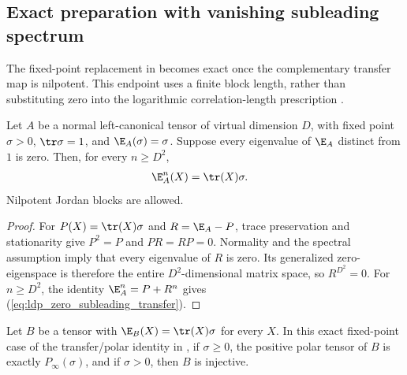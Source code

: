 \subsection{Exact preparation with vanishing subleading spectrum}

The fixed-point replacement in \cite{Malz2024Preparation} becomes exact
once the complementary transfer map is nilpotent. This endpoint uses a
finite block length, rather than substituting zero into the logarithmic
correlation-length prescription
\cite{gap:mswc24_zero_subleading_spectrum_endpoint}.

\begin{lemma}
    \label{thm:ldp_zero_subleading_transfer_stabilization}
    \leanok
    Let $A$ be a normal left-canonical tensor of virtual dimension $D$,
    with fixed point $\sigma>0$, $\tr\sigma=1$, and
    $\E_A(\sigma)=\sigma$. Suppose every eigenvalue of $\E_A$ distinct
    from $1$ is zero. Then, for every $n\geq D^2$,
    \begin{align}
        \E_A^n(X) & =\tr(X)\sigma.
        \label{eq:ldp_zero_subleading_transfer}
    \end{align}
    Nilpotent Jordan blocks are allowed.
\end{lemma}

\begin{proof}\leanok
    For $P(X)=\tr(X)\sigma$ and $R=\E_A-P$, trace preservation and
    stationarity give $P^2=P$ and $PR=RP=0$. Normality and the spectral
    assumption imply that every eigenvalue of $R$ is zero. Its generalized
    zero-eigenspace is therefore the entire $D^2$-dimensional matrix
    space, so $R^{D^2}=0$. For $n\geq D^2$, the identity
    $\E_A^n=P+R^n$ gives (\ref{eq:ldp_zero_subleading_transfer}).
\end{proof}

\begin{lemma}
    \label{thm:ldp_exact_fixed_point_polar}
    \leanok
    Let $B$ be a tensor with $\E_B(X)=\tr(X)\sigma$ for every $X$.
    In this exact fixed-point case of the transfer/polar identity in
    \cite{Malz2024Preparation}, if $\sigma\geq0$, the positive polar
    tensor of $B$ is exactly $P_\infty(\sigma)$, and if $\sigma>0$, then
    $B$ is injective.
\end{lemma}

